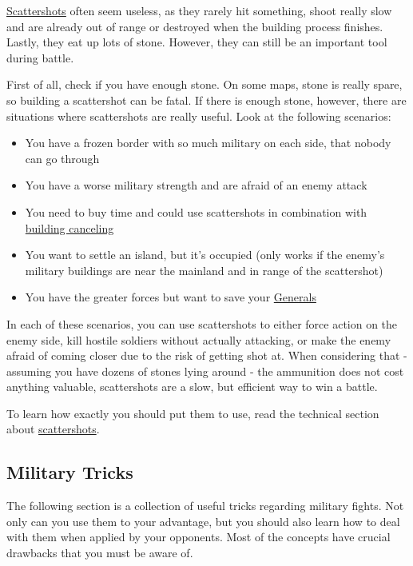 \documentclass[12pt]{article}
\begin{document}
\hyperref[sec:scattershot]{Scattershots} often seem useless, as they rarely hit something, shoot really slow and are already out of range or destroyed when the building process finishes. Lastly, they eat up lots of stone. However, they can still be an important tool during battle.

First of all, check if you have enough stone. On some maps, stone is really spare, so building a scattershot can be fatal. If there is enough stone, however, there are situations where scattershots are really useful. Look at the following scenarios:

\begin{itemize}
    \item You have a frozen border with so much military on each side, that nobody can go through
    \item You have a worse military strength and are afraid of an enemy attack
    \item You need to buy time and could use scattershots in combination with \hyperref[sec:buildingcanceling]{building canceling}
    \item You want to settle an island, but it's occupied (only works if the enemy's military buildings are near the mainland and in range of the scattershot)
    \item You have the greater forces but want to save your \hyperref[sec:general]{Generals}
\end{itemize}

In each of these scenarios, you can use scattershots to either force action on the enemy side, kill hostile soldiers without actually attacking, or make the enemy afraid of coming closer due to the risk of getting shot at. When considering that - assuming you have dozens of stones lying around - the ammunition does not cost anything valuable, scattershots are a slow, but efficient way to win a battle.

To learn how exactly you should put them to use, read the technical section about \hyperref[sec:scattershot]{scattershots}.

\subsection{Military Tricks}
\label{sec:militarytricks}

The following section is a collection of useful tricks regarding military fights. Not only can you use them to your advantage, but you should also learn how to deal with them when applied by your opponents. Most of the concepts have crucial drawbacks that you must be aware of.
\end{document}
